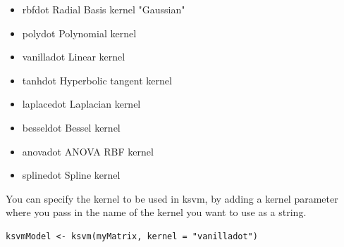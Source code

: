 \begin{itemize}
	\item rbfdot Radial Basis kernel "Gaussian"
	\item polydot Polynomial kernel
	\item vanilladot Linear kernel
	\item tanhdot Hyperbolic tangent kernel
	\item laplacedot Laplacian kernel
	\item besseldot Bessel kernel
	\item anovadot ANOVA RBF kernel
	\item splinedot Spline kernel
\end{itemize}

You can specify the kernel to be used in ksvm, by adding a kernel parameter where you pass in the name of the kernel you want to use as a string.

\begin{verbatim}
ksvmModel <- ksvm(myMatrix, kernel = "vanilladot")
\end{verbatim}


